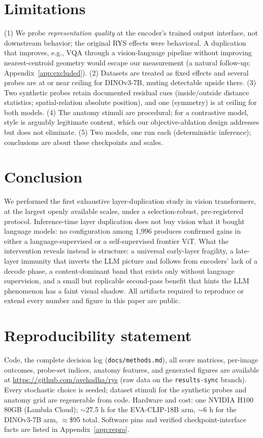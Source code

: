 \documentclass{article}
\newcommand{\eva}{EVA-CLIP-18B}
\newcommand{\dino}{DINOv3-7B}
\begin{document}
\section{Limitations}
\label{sec:limitations}

(1) We probe \emph{representation quality} at the encoder's trained
output interface, not downstream behavior; the original RYS effects were
behavioral. A duplication that improves, e.g., VQA through a
vision-language pipeline without improving nearest-centroid geometry
would escape our measurement (a natural follow-up; Appendix~\ref{app:excluded}).
(2) Datasets are treated as fixed effects and several probes are at or
near ceiling for \dino{}, muting detectable upside there. (3) Two
synthetic probes retain documented residual cues (inside/outside distance
statistics; spatial-relation absolute position), and one (symmetry) is at
ceiling for both models. (4) The anatomy stimuli are procedural; for a
contrastive model, style is arguably legitimate content, which our
objective-ablation design addresses but does not eliminate. (5) Two
models, one run each (deterministic inference); conclusions are about
these checkpoints and scales.

\section{Conclusion}
\label{sec:conclusion}

We performed the first exhaustive layer-duplication study in vision
transformers, at the largest openly available scales, under a
selection-robust, pre-registered protocol. Inference-time layer
duplication does not buy vision what it bought language models: no
configuration among 1{,}996 produces confirmed gains in either a
language-supervised or a self-supervised frontier ViT. What the
intervention reveals instead is structure: a universal early-layer
fragility, a late-layer immunity that inverts the LLM picture and follows
from encoders' lack of a decode phase, a content-dominant band that
exists only without language supervision, and a small but replicable
second-pass benefit that hints the LLM phenomenon has a faint visual
shadow. All artifacts required to reproduce or extend every number and
figure in this paper are public.

\section*{Reproducibility statement}

Code, the complete decision log (\texttt{docs/methods.md}), all score
matrices, per-image outcomes, probe-set indices, anatomy features, and
generated figures are available at \url{https://github.com/avchadha/rys}
(raw data on the \texttt{results-sync} branch). Every stochastic choice
is seeded; dataset stimuli for the synthetic probes and anatomy grid are
regenerable from code. Hardware and cost: one NVIDIA H100 80GB
(Lambda Cloud); $\sim$27.5 h for the \eva{} arm, $\sim$6 h for the
\dino{} arm, $\approx$\$95 total. Software pins and verified
checkpoint-interface facts are listed in Appendix~\ref{app:repro}.
\end{document}
